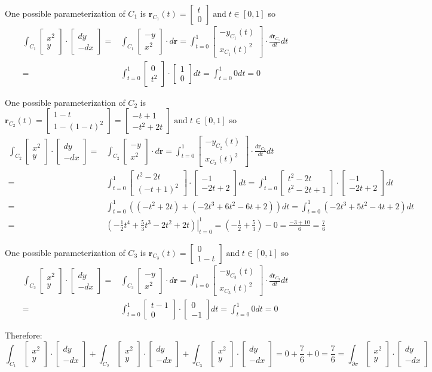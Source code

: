 \documentclass{article}
\newcommand{\colxyvec}[2]{\begin{bmatrix} #1 \\ #2 \end{bmatrix}}
\newcommand{\at}[1]{\left. #1 \right|}
\newcommand{\dr}[1]{\textcolor{dark_red}{#1}}
\begin{document}
\dr{One possible parameterization of \(C_1\) is \(\mathbf{r}_{C_1}(t) = \colxyvec{t}{0} \;\text{and}\; t \in [0,1]\) so
\begin{align*}
\int_{C_1} \colxyvec{x^2}{y} \cdot \colxyvec{dy}{-dx} = & \int_{C_1} \colxyvec{-y}{x^2} \cdot d\mathbf{r}
= \int_{t=0}^1 \colxyvec{-y_{C_1}(t)}{x_{C_1}(t)^2} \cdot \frac{d\mathbf{r}_{C_1}}{dt}dt \\
= & \int_{t=0}^1 \colxyvec{0}{t^2} \cdot \colxyvec{1}{0}dt 
= \int_{t=0}^1 0dt 
= 0 
\end{align*}}

\dr{One possible parameterization of \(C_2\) is \(\mathbf{r}_{C_2}(t) = \colxyvec{1-t}{1-(1-t)^2} = \colxyvec{-t + 1}{-t^2 + 2t} \;\text{and}\; t \in [0,1]\) so
\begin{align*}
\int_{C_2} \colxyvec{x^2}{y} \cdot \colxyvec{dy}{-dx} = & \int_{C_2} \colxyvec{-y}{x^2} \cdot d\mathbf{r}
= \int_{t=0}^1 \colxyvec{-y_{C_2}(t)}{x_{C_2}(t)^2} \cdot \frac{d\mathbf{r}_{C_2}}{dt}dt \\
= & \int_{t=0}^1 \colxyvec{t^2 - 2t}{(-t + 1)^2} \cdot \colxyvec{-1}{-2t + 2}dt 
= \int_{t=0}^1 \colxyvec{t^2 - 2t}{t^2 - 2t + 1} \cdot \colxyvec{-1}{-2t + 2}dt \\
= & \int_{t=0}^1 ((-t^2 + 2t) + (-2t^3 + 6t^2 - 6t + 2))dt 
= \int_{t=0}^1 (-2t^3 + 5t^2 - 4t + 2)dt \\
= & \at{(-\frac{1}{2}t^4 + \frac{5}{3}t^3 - 2t^2 + 2t)}_{t=0}^1 
= (-\frac{1}{2} + \frac{5}{3}) - 0 
= \frac{-3 + 10}{6}
= \frac{7}{6}
\end{align*}}

\dr{One possible parameterization of \(C_3\) is \(\mathbf{r}_{C_3}(t) = \colxyvec{0}{1 - t} \;\text{and}\; t \in [0,1]\) so
\begin{align*}
\int_{C_3} \colxyvec{x^2}{y} \cdot \colxyvec{dy}{-dx} = & \int_{C_3} \colxyvec{-y}{x^2} \cdot d\mathbf{r} 
= \int_{t=0}^1 \colxyvec{-y_{C_3}(t)}{x_{C_3}(t)^2} \cdot \frac{d\mathbf{r}_{C_3}}{dt}dt \\ 
= & \int_{t=0}^1 \colxyvec{t - 1}{0} \cdot \colxyvec{0}{-1}dt 
= \int_{t=0}^1 0dt
= 0 
\end{align*}}

\dr{Therefore: \[\int_{C_1} \colxyvec{x^2}{y} \cdot \colxyvec{dy}{-dx} + \int_{C_2} \colxyvec{x^2}{y} \cdot \colxyvec{dy}{-dx} + \int_{C_3} \colxyvec{x^2}{y} \cdot \colxyvec{dy}{-dx} = 0 + \frac{7}{6} + 0 = \frac{7}{6} = \int_{\partial\sigma} \colxyvec{x^2}{y} \cdot \colxyvec{dy}{-dx}\]}
\end{document}
